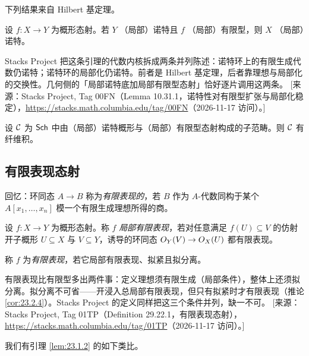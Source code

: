 下列结果来自 Hilbert 基定理。

\begin{lemma}\label{lem:23.1.7}
设 $f\colon X \to Y$ 为概形态射。若 $Y$ （局部）诺特且 $f$ （局部）有限型，则 $X$ （局部）诺特。
\end{lemma}

\begin{yizhu}
Stacks Project 把这条引理的代数内核拆成两条并列陈述：诺特环上的有限生成代数仍诺特；诺特环的局部化仍诺特。前者是 Hilbert 基定理，后者靠理想与局部化的交换性。几何侧的「局部诺特底加局部有限型态射」恰好逐片调用这两条。
[来源：Stacks Project, Tag 00FN（Lemma 10.31.1，诺特性对有限型扩张与局部化稳定），\url{https://stacks.math.columbia.edu/tag/00FN}（2026-11-17 访问）。]
\end{yizhu}

\begin{corollary}\label{cor:23.1.8}
设 $\mathcal{C}$ 为 $\mathsf{Sch}$ 中由（局部）诺特概形与（局部）有限型态射构成的子范畴。则 $\mathcal{C}$ 有纤维积。
\end{corollary}

\subsection{有限表现态射}\label{sec:23.2}

回忆：环同态 $A \to B$ 称为\emph{有限表现的}，若 $B$ 作为 $A$-代数同构于某个 $A[x_1,\dots,x_n]$ 模一个有限生成理想所得的商。

\begin{definition}\label{def:23.2.1}
设 $f\colon X \to Y$ 为概形态射。称 $f$ \emph{局部有限表现}，若对任意满足 $f(U) \subseteq V$ 的仿射开子概形 $U \subseteq X$ 与 $V \subseteq Y$，诱导的环同态 $O_Y(V) \to O_X(U)$ 都有限表现。

称 $f$ 为\emph{有限表现}，若它局部有限表现、拟紧且拟分离。
\end{definition}

\begin{yizhu}
有限表现比有限型多出两件事：定义理想须有限生成（局部条件），整体上还须拟分离。拟分离不可省——开浸入总局部有限表现，但只有拟紧时才有限表现（推论 \ref{cor:23.2.4}）。Stacks Project 的定义同样把这三个条件并列，缺一不可。
[来源：Stacks Project, Tag 01TP（Definition 29.22.1，有限表现态射），\url{https://stacks.math.columbia.edu/tag/01TP}（2026-11-17 访问）。]
\end{yizhu}

我们有引理 \ref{lem:23.1.2} 的如下类比。

